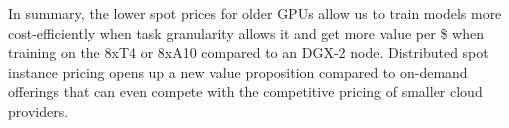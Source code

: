 In summary, the lower spot prices for older GPUs allow us to train models more cost-efficiently when task granularity allows it and get more value per \$ when training on the 8xT4 or 8xA10 compared to an DGX-2 node.
Distributed spot instance pricing opens up a new value proposition compared to on-demand offerings that can even compete with the competitive pricing of smaller cloud providers.